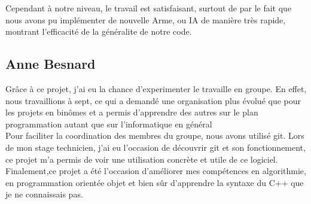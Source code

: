             Cependant à notre niveau, le travail est satisfaisant, surtout de par le fait que nous avons pu implémenter de nouvelle Arme, ou IA de manière très rapide, montrant l'efficacité de la généralite de notre code.
        \subsection{Anne Besnard}
            Grâce à ce projet, j'ai eu la chance d'experimenter le travaille en groupe. En effet, nous travaillions à sept, ce qui a demandé une organisation plus évolué que pour les projets en binômes et a permis d'apprendre des autres sur le plan programmation autant que sur l'informatique en général\\

            Pour faciliter la coordination des membres du groupe,  nous avons utilisé git. Lors de mon stage technicien, j'ai eu l'occasion de découvrir git et son fonctionnement, ce projet m'a permis de voir une utilisation concrète et utile de ce logiciel.\\

            Finalement,ce projet a été l'occasion d'améliorer mes compétences en algorithmie, en programmation orientée objet et bien sûr d'apprendre la syntaxe du C++ que je ne connaissais pas. 
